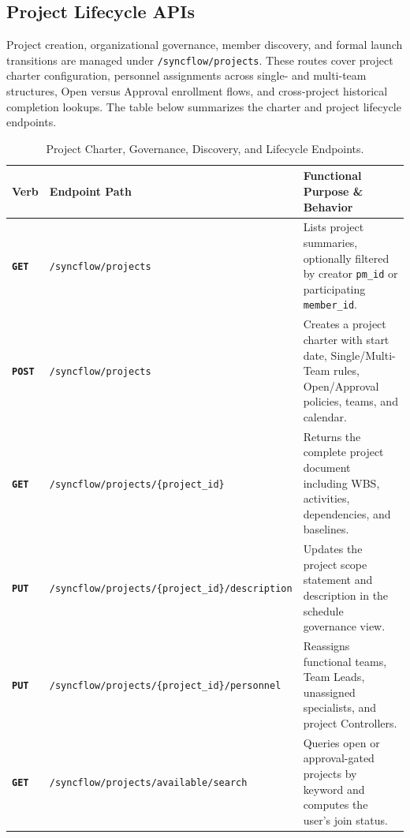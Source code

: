 \newpage

\subsection{Project Lifecycle APIs}
Project creation, organizational governance, member discovery, and formal launch transitions are managed under \texttt{/syncflow/projects}. These routes cover project charter configuration, personnel assignments across single- and multi-team structures, Open versus Approval enrollment flows, and cross-project historical completion lookups. The table below summarizes the charter and project lifecycle endpoints.

\vspace{4mm}

\begin{table}[H]
\centering
\small
\setlength{\tabcolsep}{5pt}
\renewcommand{\arraystretch}{1.28}
\caption*{Project Charter, Governance, Discovery, and Lifecycle Endpoints.}
\vspace{-2pt}
\begin{tabularx}{\textwidth}{p{1.3cm} >{\raggedright\arraybackslash}p{6.0cm} X}
\toprule
\textbf{Verb} & \textbf{Endpoint Path} & \textbf{Functional Purpose \& Behavior} \\
\midrule
\textbf{\texttt{GET}} & \texttt{/syncflow/projects} & Lists project summaries, optionally filtered by creator \texttt{pm\_id} or participating \texttt{member\_id}. \\
\textbf{\texttt{POST}} & \texttt{/syncflow/projects} & Creates a project charter with start date, Single/Multi-Team rules, Open/Approval policies, teams, and calendar. \\
\textbf{\texttt{GET}} & \texttt{/syncflow/projects/\{project\_id\}} & Returns the complete project document including WBS, activities, dependencies, and baselines. \\
\textbf{\texttt{PUT}} & \texttt{/syncflow/projects/\{project\_id\}/\allowbreak description} & Updates the project scope statement and description in the schedule governance view. \\
\textbf{\texttt{PUT}} & \texttt{/syncflow/projects/\{project\_id\}/\allowbreak personnel} & Reassigns functional teams, Team Leads, unassigned specialists, and project Controllers. \\
\textbf{\texttt{GET}} & \texttt{/syncflow/projects/\allowbreak available/search} & Queries open or approval-gated projects by keyword and computes the user's join status. \\

\end{tabularx}
\end{table}
